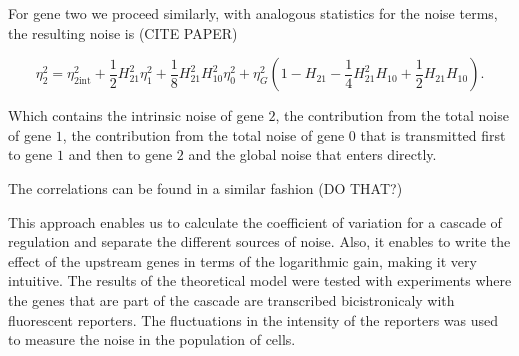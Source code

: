 For gene two we proceed similarly, with analogous statistics for the noise terms, the resulting noise is (CITE PAPER)

\begin{equation}
  \label{eq:etagene2}
  \boxed{\eta_2^2 = \eta_{2\text{int}}^2 + \frac{1}{2}H_{21}^2\eta_1^2+\frac{1}{8}H_{21}^2H_{10}^2\eta_0^2+\eta_G^2\left(1-H_{21}-\frac{1}{4}H_{21}^2H_{10}+\frac{1}{2}H_{21}H_{10}\right)}.
\end{equation}

Which contains the intrinsic noise of gene $2$, the contribution from the total noise of gene $1$, the contribution from the total noise of gene $0$ that is transmitted first to gene $1$ and then to gene $2$ and the global noise that enters directly.

The correlations can be found in a similar fashion (DO THAT?)

This approach enables us to calculate the coefficient of variation for a cascade of regulation and separate the different sources of noise. Also, it enables to write the effect of the upstream genes in terms of the logarithmic gain, making it very intuitive. The results of the theoretical model were tested with experiments where the genes that are part of the cascade are transcribed bicistronicaly with fluorescent reporters. The fluctuations in the intensity of the reporters was used to measure the noise in the population of cells.
